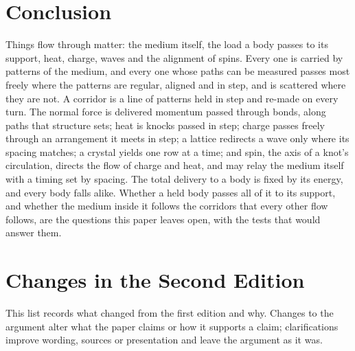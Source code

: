 \documentclass[11pt,a4paper]{article}
\begin{document}
\section*{Conclusion}

Things flow through matter: the medium itself, the load a body passes to its support, heat, charge, waves and the alignment of spins. Every one is carried by patterns of the medium, and every one whose paths can be measured passes most freely where the patterns are regular, aligned and in step, and is scattered where they are not. A corridor is a line of patterns held in step and re-made on every turn. The normal force is delivered momentum passed through bonds, along paths that structure sets; heat is knocks passed in step; charge passes freely through an arrangement it meets in step; a lattice redirects a wave only where its spacing matches; a crystal yields one row at a time; and spin, the axis of a knot's circulation, directs the flow of charge and heat, and may relay the medium itself with a timing set by spacing. The total delivery to a body is fixed by its energy, and every body falls alike. Whether a held body passes all of it to its support, and whether the medium inside it follows the corridors that every other flow follows, are the questions this paper leaves open, with the tests that would answer them.

\clearpage
\section*{Changes in the Second Edition}

This list records what changed from the first edition and why. Changes to the argument alter what the paper claims or how it supports a claim; clarifications improve wording, sources or presentation and leave the argument as it was.
\end{document}
